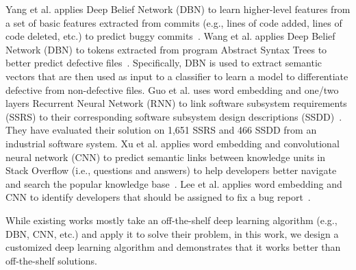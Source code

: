 Yang et al. applies Deep Belief Network (DBN) to learn higher-level features from a set of basic features extracted from commits (e.g., lines of code added, lines of code deleted, etc.) to predict buggy commits~\cite{YangLXZS15}. Wang et al. applies Deep Belief Network (DBN) to tokens extracted from program Abstract Syntax Trees to better predict defective files~\cite{WangLT16}. Specifically, DBN is used to extract semantic vectors that are then used as input to a classifier to learn a model to differentiate defective from non-defective files. Guo et al. uses word embedding and one/two layers Recurrent Neural Network (RNN) to link software subsystem requirements (SSRS) to their corresponding software subsystem design descriptions (SSDD)~\cite{0004CC17}. They have evaluated their solution on 1,651 SSRS and 466 SSDD from an industrial software system. Xu et al. applies word embedding and convolutional neural network (CNN) to predict semantic links between knowledge units in Stack Overflow (i.e., questions and answers) to help developers better navigate and search the popular knowledge base~\cite{XuYXXCL16}. Lee et al. applies word embedding and CNN to identify developers that should be assigned to fix a bug report~\cite{LeeHLKJ17}.

While existing works mostly take an off-the-shelf deep learning algorithm (e.g., DBN, CNN, etc.) and apply it to solve their problem, in this work, we design a customized deep learning algorithm and demonstrates that it works better than off-the-shelf solutions. 

